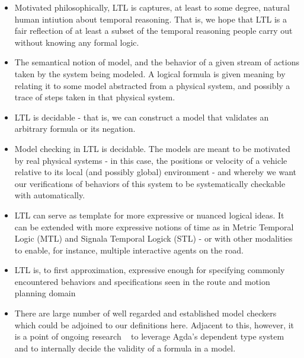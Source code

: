 \documentclass[a4paper, 11pt]{article}
\begin{document}
\begin{itemize}


\item Motivated philosophically, LTL is captures, at least to some degree,
natural human intiution about temporal reasoning. That is, we hope that LTL is a
fair reflection of at least a subset of the temporal reasoning people carry out
without knowing any formal logic.

\item The semantical notion of model, and the behavior of a given stream of
actions taken by the system being modeled. A logical formula is given meaning by
relating it to some model abstracted from a physical system, and possibly a
trace of steps taken in that physical system.

\item LTL is decidable - that is, we can construct a model that validates an arbitrary formula or its
negation.

\item Model checking in LTL is decidable. The models are meant to be motivated
by real physical systems - in this case, the positions or velocity of a vehicle
relative to its local (and possibly global) environment - and whereby we want
our verifications of behaviors of this system to be systematically checkable
with automatically.

\item LTL can serve as template for more expressive or nuanced logical ideas. It
can be extended with more expressive notions of time as in Metric Temporal Logic
(MTL) and Signala Temporal Logick (STL) - or with other modalities to enable,
for instance, multiple interactive agents on the road.

\item LTL is, to first approximation, expressive enough for specifying commonly
encountered behaviors and specifications seen in the route and motion planning
domain

\item There are large number of well regarded and established model checkers
which could be adjoined to our definitions here. Adjacent to this, however, it
is a point of ongoing research ~\cite{appPf} to leverage Agda's dependent type system
and to internally decide the validity of a formula in a model.

\end{itemize}
\end{document}
